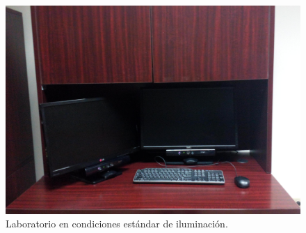 \begin{figure}[h!]
\begin{center} 
\includegraphics[scale=0.09]{./Figures/iluminacion.jpg}
\end{center}
\caption{Laboratorio en condiciones estándar de iluminación.}
\label{fig:LabIluminado}
\end{figure} 

